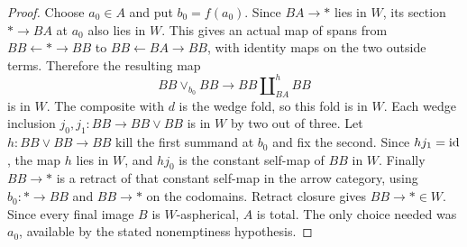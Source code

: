\begin{proof}
Choose $a_0\in A$ and put $b_0=f(a_0)$. Since $BA\to *$ lies in $W$, its section $*\to BA$ at $a_0$ also lies in $W$. This gives an actual map of spans from
$BB\leftarrow *\to BB$ to $BB\leftarrow BA\to BB$, with identity maps on the two outside terms. Therefore the resulting map
\[
 BB\vee_{b_0}BB\longrightarrow BB\amalg_{BA}^{h}BB
\]
is in $W$. The composite with $d$ is the wedge fold, so this fold is in $W$. Each wedge inclusion $j_0,j_1:BB\to BB\vee BB$ is in $W$ by two out of three. Let $h:BB\vee BB\to BB$ kill the first summand at $b_0$ and fix the second. Since $hj_1=\mathrm{id}$, the map $h$ lies in $W$, and $hj_0$ is the constant self-map of $BB$ in $W$. Finally $BB\to *$ is a retract of that constant self-map in the arrow category, using $b_0:*\to BB$ and $BB\to *$ on the codomains. Retract closure gives $BB\to *\in W$. Since every final image $B$ is $W$-aspherical, $A$ is total. The only choice needed was $a_0$, available by the stated nonemptiness hypothesis.
\end{proof}

